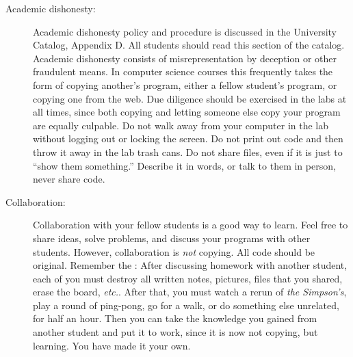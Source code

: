 \documentclass{article}
\begin{document}
\begin{description}
\item [Academic dishonesty:] Academic dishonesty policy and
  procedure is discussed in the University Catalog, Appendix D.  All
  students should read this section of the catalog.  Academic
  dishonesty consists of misrepresentation by deception or other
  fraudulent means.  In computer science courses this frequently takes
  the form of copying another's program, either a fellow student's
  program, or copying one from the web.  Due diligence should be
  exercised in the labs at all times, since both copying and letting
  someone else copy your program are equally culpable.  Do not walk
  away from your computer in the lab without logging out or locking
  the screen.  Do not print out code and then throw it away in the lab
  trash cans. Do not share files, even if it is just to ``show them
  something.''  Describe it in words, or talk to them in person, never
  share code.

\item [Collaboration:] Collaboration with your fellow students is
  a good way to learn.  Feel free to share ideas, solve problems, and
  discuss your programs with other students.  However, collaboration
  is {\em not} copying.  All code should be original.  Remember the
  : After discussing homework with
  another student, each of you must destroy all written notes,
  pictures, files that you shared, erase the board, {\em
    etc.}.  After that, you must watch a rerun of {\em the Simpson's},
  play a round of ping-pong, go for a walk, or do something else
  unrelated, for half an hour.  Then you can take the knowledge you
  gained from another student and put it to work, since it is now not
  copying, but learning.  You have made it your own.

\end{description}
\end{document}
